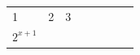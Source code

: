 {\begin{tabular}[t]{|l|l|l|l|l|l|l|l|}
    
        1 &
    
    
        2 &
    
    
        3%
     \tabularnewline\cline{1-1}\cline{2-2}\cline{3-3}\cline{4-4}\cline{5-5}\cline{6-6}\cline{7-7}\cline{8-8}
    
    
        
                \begin{math}{2}^{x+1}\end{math}
               &
    
    
         &
    
    
         &
    
    
         &
    
    
         &
    

\end{tabular}}

